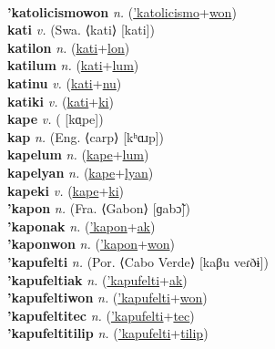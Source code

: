  \label{'katolicismoak} \\
\textbf{'katolicismowon} \textit{n.} (\hyperref['katolicismo]{'katolicismo}+\hyperref[won]{won})
 \label{'katolicismowon} \\
\textbf{kati} \textit{v.} (Swa. ⟨kati⟩ [kati])
 \label{kati} \\
\textbf{katilon} \textit{n.} (\hyperref[kati]{kati}+\hyperref[lon]{lon})
 \label{katilon} \\
\textbf{katilum} \textit{n.} (\hyperref[kati]{kati}+\hyperref[lum]{lum})
 \label{katilum} \\
\textbf{katinu} \textit{v.} (\hyperref[kati]{kati}+\hyperref[nu]{nu})
 \label{katinu} \\
\textbf{katiki} \textit{v.} (\hyperref[kati]{kati}+\hyperref[ki]{ki})
 \label{katiki} \\
\textbf{kape} \textit{v.} ( [kɑ̤pe])
 \label{kape} \\
\textbf{kap} \textit{n.} (Eng. ⟨carp⟩ [kʰɑɹp])
 \label{kap} \\
\textbf{kapelum} \textit{n.} (\hyperref[kape]{kape}+\hyperref[lum]{lum})
 \label{kapelum} \\
\textbf{kapelyan} \textit{n.} (\hyperref[kape]{kape}+\hyperref[lyan]{lyan})
 \label{kapelyan} \\
\textbf{kapeki} \textit{v.} (\hyperref[kape]{kape}+\hyperref[ki]{ki})
 \label{kapeki} \\
\textbf{'kapon} \textit{n.} (Fra. ⟨Gabon⟩ [ɡabɔ̃])
 \label{'kapon} \\
\textbf{'kaponak} \textit{n.} (\hyperref['kapon]{'kapon}+\hyperref[ak]{ak})
 \label{'kaponak} \\
\textbf{'kaponwon} \textit{n.} (\hyperref['kapon]{'kapon}+\hyperref[won]{won})
 \label{'kaponwon} \\
\textbf{'kapufelti} \textit{n.} (Por. ⟨Cabo Verde⟩ [kaβu veɾðɨ])
 \label{'kapufelti} \\
\textbf{'kapufeltiak} \textit{n.} (\hyperref['kapufelti]{'kapufelti}+\hyperref[ak]{ak})
 \label{'kapufeltiak} \\
\textbf{'kapufeltiwon} \textit{n.} (\hyperref['kapufelti]{'kapufelti}+\hyperref[won]{won})
 \label{'kapufeltiwon} \\
\textbf{'kapufeltitec} \textit{n.} (\hyperref['kapufelti]{'kapufelti}+\hyperref[tec]{tec})
 \label{'kapufeltitec} \\
\textbf{'kapufeltitilip} \textit{n.} (\hyperref['kapufelti]{'kapufelti}+\hyperref[tilip]{tilip})
 \label{'kapufeltitilip} \\

